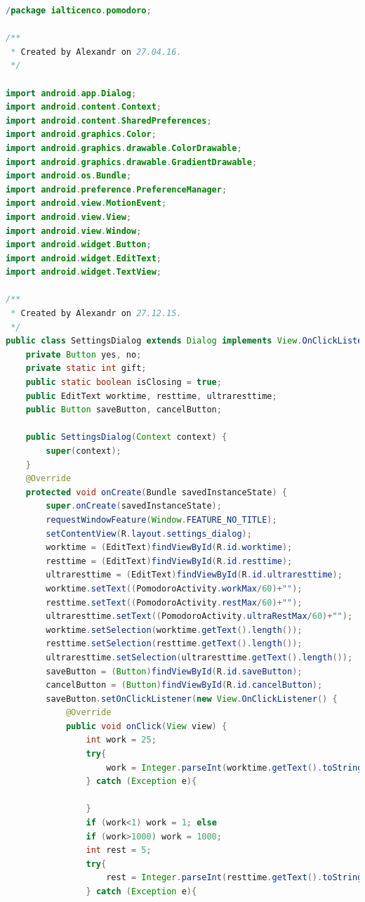\documentclass[12pt]{article}
\begin{document}
\begin{lstlisting}[language=java, caption={Fisierul settings\_dialog.xml}, label=list2]
/package ialticenco.pomodoro;

/**
 * Created by Alexandr on 27.04.16.
 */

import android.app.Dialog;
import android.content.Context;
import android.content.SharedPreferences;
import android.graphics.Color;
import android.graphics.drawable.ColorDrawable;
import android.graphics.drawable.GradientDrawable;
import android.os.Bundle;
import android.preference.PreferenceManager;
import android.view.MotionEvent;
import android.view.View;
import android.view.Window;
import android.widget.Button;
import android.widget.EditText;
import android.widget.TextView;

/**
 * Created by Alexandr on 27.12.15.
 */
public class SettingsDialog extends Dialog implements View.OnClickListener, View.OnTouchListener{
    private Button yes, no;
    private static int gift;
    public static boolean isClosing = true;
    public EditText worktime, resttime, ultraresttime;
    public Button saveButton, cancelButton;

    public SettingsDialog(Context context) {
        super(context);
    }
    @Override
    protected void onCreate(Bundle savedInstanceState) {
        super.onCreate(savedInstanceState);
        requestWindowFeature(Window.FEATURE_NO_TITLE);
        setContentView(R.layout.settings_dialog);
        worktime = (EditText)findViewById(R.id.worktime);
        resttime = (EditText)findViewById(R.id.resttime);
        ultraresttime = (EditText)findViewById(R.id.ultraresttime);
        worktime.setText((PomodoroActivity.workMax/60)+"");
        resttime.setText((PomodoroActivity.restMax/60)+"");
        ultraresttime.setText((PomodoroActivity.ultraRestMax/60)+"");
        worktime.setSelection(worktime.getText().length());
        resttime.setSelection(resttime.getText().length());
        ultraresttime.setSelection(ultraresttime.getText().length());
        saveButton = (Button)findViewById(R.id.saveButton);
        cancelButton = (Button)findViewById(R.id.cancelButton);
        saveButton.setOnClickListener(new View.OnClickListener() {
            @Override
            public void onClick(View view) {
                int work = 25;
                try{
                    work = Integer.parseInt(worktime.getText().toString());
                } catch (Exception e){

                }
                if (work<1) work = 1; else
                if (work>1000) work = 1000;
                int rest = 5;
                try{
                    rest = Integer.parseInt(resttime.getText().toString());
                } catch (Exception e){


\end{lstlisting}
\end{document}
